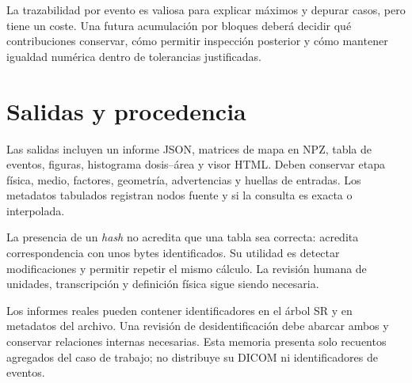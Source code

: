 La trazabilidad por evento es valiosa para explicar máximos y depurar casos, pero tiene un coste. Una futura acumulación por bloques deberá decidir qué contribuciones conservar, cómo permitir inspección posterior y cómo mantener igualdad numérica dentro de tolerancias justificadas.

\section{Salidas y procedencia}
Las salidas incluyen un informe JSON, matrices de mapa en NPZ, tabla de eventos, figuras, histograma dosis--área y visor HTML. Deben conservar etapa física, medio, factores, geometría, advertencias y huellas de entradas. Los metadatos tabulados registran nodos fuente y si la consulta es exacta o interpolada.

La presencia de un \emph{hash} no acredita que una tabla sea correcta: acredita correspondencia con unos bytes identificados. Su utilidad es detectar modificaciones y permitir repetir el mismo cálculo. La revisión humana de unidades, transcripción y definición física sigue siendo necesaria.

Los informes reales pueden contener identificadores en el árbol SR y en metadatos del archivo. Una revisión de desidentificación debe abarcar ambos y conservar relaciones internas necesarias. Esta memoria presenta solo recuentos agregados del caso de trabajo; no distribuye su DICOM ni identificadores de eventos.

